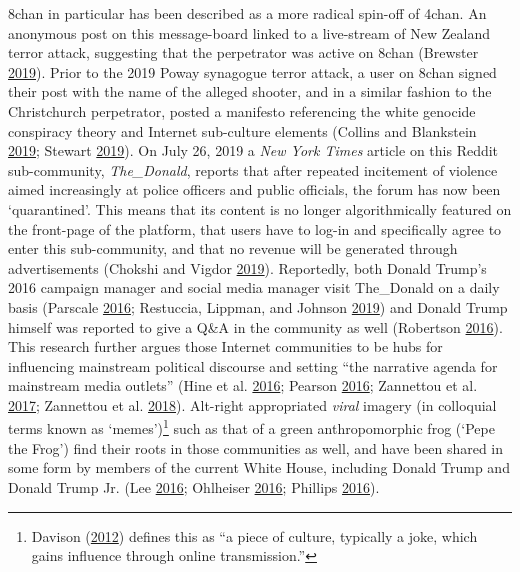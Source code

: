 \documentclass[10pt,british,A4paper,,openany]{memoir}
\begin{document}
8chan in particular has been described as a more radical spin-off of
4chan. An anonymous post on this message-board linked to a live-stream
of New Zealand terror attack, suggesting that the perpetrator was active
on 8chan (Brewster \protect\hyperlink{ref-brewster_after_2019}{2019}).
Prior to the 2019 Poway synagogue terror attack, a user on 8chan signed
their post with the name of the alleged shooter, and in a similar
fashion to the Christchurch perpetrator, posted a manifesto referencing
the white genocide conspiracy theory and Internet sub-culture elements
(Collins and Blankstein
\protect\hyperlink{ref-collins_anti-semitic_2019}{2019}; Stewart
\protect\hyperlink{ref-stewart_8chan_2019}{2019}). On July 26, 2019 a
\emph{New York Times} article on this Reddit sub-community,
\emph{The\_Donald}, reports that after repeated incitement of violence
aimed increasingly at police officers and public officials, the forum
has now been `quarantined'. This means that its content is no longer
algorithmically featured on the front-page of the platform, that users
have to log-in and specifically agree to enter this sub-community, and
that no revenue will be generated through advertisements (Chokshi and
Vigdor \protect\hyperlink{ref-chokshi_reddit_2019}{2019}). Reportedly,
both Donald Trump's 2016 campaign manager and social media manager visit
The\_Donald on a daily basis (Parscale
\protect\hyperlink{ref-parscale_reddit_2016}{2016}; Restuccia, Lippman,
and Johnson \protect\hyperlink{ref-restuccia_get_2019}{2019}) and Donald
Trump himself was reported to give a Q\&A in the community as well
(Robertson \protect\hyperlink{ref-robertson_donald_2016}{2016}). This
research further argues those Internet communities to be hubs for
influencing mainstream political discourse and setting ``the narrative
agenda for mainstream media outlets'' (Hine et al.
\protect\hyperlink{ref-hine_kek_2016}{2016}; Pearson
\protect\hyperlink{ref-pearson_scientists_2016}{2016}; Zannettou et al.
\protect\hyperlink{ref-zannettou_web_2017}{2017}; Zannettou et al.
\protect\hyperlink{ref-zannettou_origins_2018}{2018}). Alt-right
appropriated \emph{viral} imagery (in colloquial terms known as
`memes')\footnote{Davison
  (\protect\hyperlink{ref-davison_language_2012}{2012}) defines this as
  ``a piece of culture, typically a joke, which gains influence through
  online transmission.''} such as that of a green anthropomorphic frog
(`Pepe the Frog') find their roots in those communities as well, and
have been shared in some form by members of the current White House,
including Donald Trump and Donald Trump Jr. (Lee
\protect\hyperlink{ref-lee_understanding_2016}{2016}; Ohlheiser
\protect\hyperlink{ref-ohlheiser_analysis_2016}{2016}; Phillips
\protect\hyperlink{ref-phillips_alt-right_2016}{2016}).
\end{document}
